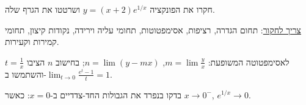 
\begin{question}
חקרו את הפונקציה $y=(x+2)e^{1/x}$ ושרטטו את הגרף שלה.

\underline{צריך לחקור}: תחום הגדרה, רציפות, אסימפטוטות, תחומי עליה וירידה, נקודות קיצון, תחומי קמירות וקעירות.
\end{question}

\begin{hint}
לאסימפטוטה המשופעת: $m=\lim\frac{y}{x}$, $n=\lim(y-mx)$; בחישוב $n$ הציבו $t=\frac1x$ והשתמשו ב-$\lim_{t\to0}\frac{e^t-1}{t}=1$.
\end{hint}

\begin{hint}
בדקו בנפרד את הגבולות החד-צדדיים ב-$x=0$: כאשר $x\to0^-$, $e^{1/x}\to0$.
\end{hint}

